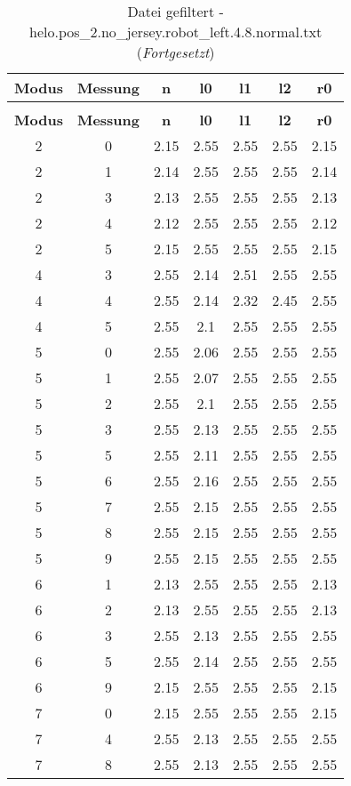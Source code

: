 \begin{longtable}{|c|c||c||c|c|c||c|}
	\caption{Datei gefiltert - helo.pos\_2.no\_jersey.robot\_left.4.8.normal.txt} \label{tab:helo.pos-2.no-jersey.robot-left.4.8.normal.txt} \\ \hline
	\textbf{Modus} & \textbf{Messung} & \textbf{n} & \textbf{l0} & \textbf{l1} & \textbf{l2} & \textbf{r0}\\ \hline
	\endfirsthead
	\caption[]{Datei gefiltert - helo.pos\_2.no\_jersey.robot\_left.4.8.normal.txt (\emph{Fortgesetzt})} \\ \hline
	\textbf{Modus} & \textbf{Messung} & \textbf{n} & \textbf{l0} & \textbf{l1} & \textbf{l2} & \textbf{r0}\\ \hline
	\endhead
	2 & 0 & 2.15 & 2.55 & 2.55 & 2.55 & 2.15 \\ \hline
	2 & 1 & 2.14 & 2.55 & 2.55 & 2.55 & 2.14 \\ \hline
	2 & 3 & 2.13 & 2.55 & 2.55 & 2.55 & 2.13 \\ \hline
	2 & 4 & 2.12 & 2.55 & 2.55 & 2.55 & 2.12 \\ \hline
	2 & 5 & 2.15 & 2.55 & 2.55 & 2.55 & 2.15 \\ \hline
	4 & 3 & 2.55 & 2.14 & 2.51 & 2.55 & 2.55 \\ \hline
	4 & 4 & 2.55 & 2.14 & 2.32 & 2.45 & 2.55 \\ \hline
	4 & 5 & 2.55 & 2.1 & 2.55 & 2.55 & 2.55 \\ \hline
	5 & 0 & 2.55 & 2.06 & 2.55 & 2.55 & 2.55 \\ \hline
	5 & 1 & 2.55 & 2.07 & 2.55 & 2.55 & 2.55 \\ \hline
	5 & 2 & 2.55 & 2.1 & 2.55 & 2.55 & 2.55 \\ \hline
	5 & 3 & 2.55 & 2.13 & 2.55 & 2.55 & 2.55 \\ \hline
	5 & 5 & 2.55 & 2.11 & 2.55 & 2.55 & 2.55 \\ \hline
	5 & 6 & 2.55 & 2.16 & 2.55 & 2.55 & 2.55 \\ \hline
	5 & 7 & 2.55 & 2.15 & 2.55 & 2.55 & 2.55 \\ \hline
	5 & 8 & 2.55 & 2.15 & 2.55 & 2.55 & 2.55 \\ \hline
	5 & 9 & 2.55 & 2.15 & 2.55 & 2.55 & 2.55 \\ \hline
	6 & 1 & 2.13 & 2.55 & 2.55 & 2.55 & 2.13 \\ \hline
	6 & 2 & 2.13 & 2.55 & 2.55 & 2.55 & 2.13 \\ \hline
	6 & 3 & 2.55 & 2.13 & 2.55 & 2.55 & 2.55 \\ \hline
	6 & 5 & 2.55 & 2.14 & 2.55 & 2.55 & 2.55 \\ \hline
	6 & 9 & 2.15 & 2.55 & 2.55 & 2.55 & 2.15 \\ \hline
	7 & 0 & 2.15 & 2.55 & 2.55 & 2.55 & 2.15 \\ \hline
	7 & 4 & 2.55 & 2.13 & 2.55 & 2.55 & 2.55 \\ \hline
	7 & 8 & 2.55 & 2.13 & 2.55 & 2.55 & 2.55 \\ \hline
\end{longtable}
